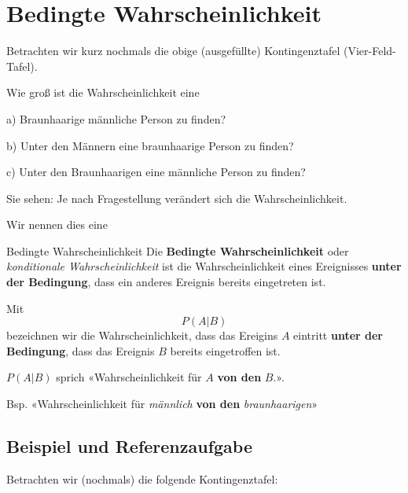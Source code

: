 
\section{Bedingte Wahrscheinlichkeit}

Betrachten wir kurz nochmals die obige (ausgefüllte) Kontingenztafel (Vier-Feld-Tafel).

Wie groß ist die Wahrscheinlichkeit eine

a) Braunhaarige männliche Person zu finden? 

b) Unter den Männern eine braunhaarige Person zu finden? 

c) Unter den Braunhaarigen eine männliche Person zu finden? 

Sie sehen: Je nach Fragestellung verändert sich die Wahrscheinlichkeit.

Wir nennen dies eine

\begin{definition}{Bedingte Wahrscheinlichkeit}{}
Die \textbf{Bedingte Wahrscheinlichkeit} oder \textit{konditionale
  Wahrscheinlichkeit} ist die Wahrscheinlichkeit eines Ereignisses
\textbf{unter der Bedingung}, dass ein anderes Ereignis bereits
eingetreten ist.
  \end{definition}

\begin{definition}{}{}
  Mit
  $$P(A | B)$$
  bezeichnen wir die Wahrscheinlichkeit, dass das Ereigins $A$
  eintritt \textbf{unter der Bedingung}, dass das Ereignis $B$ bereits
  eingetroffen ist.
\end{definition}

\begin{bemerkung}{}{}
  $P(A|B)$ sprich «Wahrscheinlichkeit für $A$ \textbf{von den} $B$.».

  Bsp. «Wahrscheinlichkeit für \textit{männlich} \textbf{von den} \textit{braunhaarigen}»  
\end{bemerkung}

\newpage


\subsection{Beispiel und Referenzaufgabe}
Betrachten wir (nochmals) die folgende Kontingenztafel:

